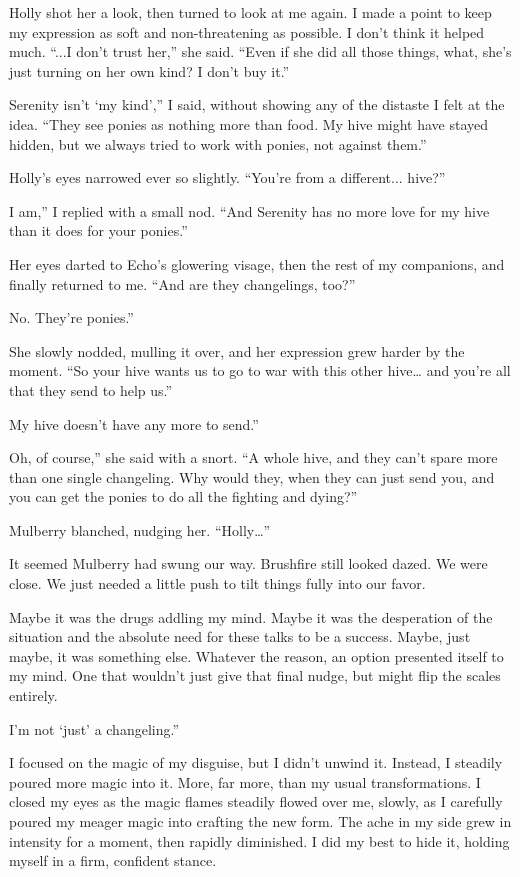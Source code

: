 Holly shot her a look, then turned to look at me again. I made a point to keep my expression as soft and non-threatening as possible. I don’t think it helped much. “...I don’t trust her,” she said. “Even if she did all those things, what, she’s just turning on her own kind? I don’t buy it.”

\leavevmode{}Serenity isn’t ‘my kind’,” I said, without showing any of the distaste I felt at the idea. “They see ponies as nothing more than food. My hive might have stayed hidden, but we always tried to work with ponies, not against them.”

Holly’s eyes narrowed ever so slightly. “You’re from a different... hive?”

\leavevmode{}I am,” I replied with a small nod. “And Serenity has no more love for my hive than it does for your ponies.”

Her eyes darted to Echo’s glowering visage, then the rest of my companions, and finally returned to me. “And are they changelings, too?”

\leavevmode{}No. They’re ponies.”

She slowly nodded, mulling it over, and her expression grew harder by the moment. “So your hive wants us to go to war with this other hive… and you’re all that they send to help us.”

\leavevmode{}My hive doesn’t have any more to send.”

\leavevmode{}Oh, of course,” she said with a snort. “A whole hive, and they can’t spare more than one single changeling. Why would they, when they can just send you, and you can get the ponies to do all the fighting and dying?”

Mulberry blanched, nudging her. “Holly…”

It seemed Mulberry had swung our way. Brushfire still looked dazed. We were close. We just needed a little push to tilt things fully into our favor.

Maybe it was the drugs addling my mind. Maybe it was the desperation of the situation and the absolute need for these talks to be a success. Maybe, just maybe, it was something else. Whatever the reason, an option presented itself to my mind. One that wouldn’t just give that final nudge, but might flip the scales entirely.

\leavevmode{}I’m not ‘just’ a changeling.”

I focused on the magic of my disguise, but I didn’t unwind it. Instead, I steadily poured more magic into it. More, far more, than my usual transformations. I closed my eyes as the magic flames steadily flowed over me, slowly, as I carefully poured my meager magic into crafting the new form. The ache in my side grew in intensity for a moment, then rapidly diminished. I did my best to hide it, holding myself in a firm, confident stance.

